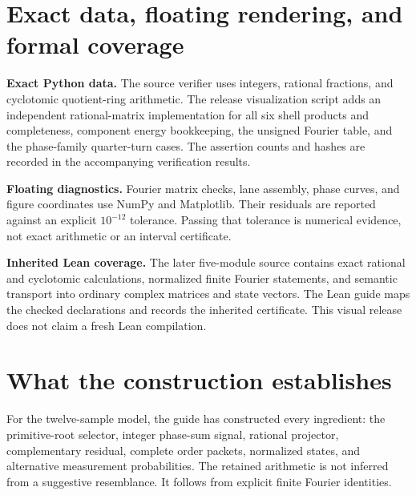 \clearpage\section*{Exact data, floating rendering, and formal coverage}
\textbf{Exact Python data.} The source verifier uses integers, rational fractions, and cyclotomic quotient-ring arithmetic. The release visualization script adds an independent rational-matrix implementation for all six shell products and completeness, component energy bookkeeping, the unsigned Fourier table, and the phase-family quarter-turn cases. The assertion counts and hashes are recorded in the accompanying verification results.

\textbf{Floating diagnostics.} Fourier matrix checks, lane assembly, phase curves, and figure coordinates use NumPy and Matplotlib. Their residuals are reported against an explicit $10^{-12}$ tolerance. Passing that tolerance is numerical evidence, not exact arithmetic or an interval certificate.

\textbf{Inherited Lean coverage.} The later five-module source contains exact rational and cyclotomic calculations, normalized finite Fourier statements, and semantic transport into ordinary complex matrices and state vectors. The Lean guide maps the checked declarations and records the inherited certificate. This visual release does not claim a fresh Lean compilation.


\clearpage\section*{What the construction establishes}
For the twelve-sample model, the guide has constructed every ingredient: the primitive-root selector, integer phase-sum signal, rational projector, complementary residual, complete order packets, normalized states, and alternative measurement probabilities. The retained arithmetic is not inferred from a suggestive resemblance. It follows from explicit finite Fourier identities.

